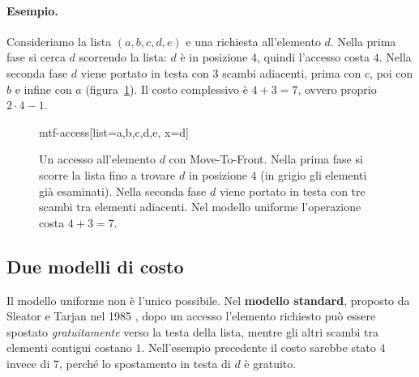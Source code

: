 \paragraph{Esempio.}
Consideriamo la lista $(a, b, c, d, e)$ e una richiesta all'elemento $d$. Nella prima fase si cerca $d$ scorrendo la lista: $d$ è in posizione $4$, quindi l'accesso costa $4$. Nella seconda fase $d$ viene portato in testa con $3$ scambi adiacenti, prima con $c$, poi con $b$ e infine con $a$ (figura~\ref{fig:mtf-accesso}). Il costo complessivo è $4 + 3 = 7$, ovvero proprio $2 \cdot 4 - 1$.

\begin{figure}[htbp]
\centering
\begin{widget}{mtf-access}[list={a,b,c,d,e}, x=d]
\end{widget}
\caption{Un accesso all'elemento $d$ con Move-To-Front. Nella prima fase si scorre la lista fino a trovare $d$ in posizione $4$ (in grigio gli elementi già esaminati). Nella seconda fase $d$ viene portato in testa con tre scambi tra elementi adiacenti. Nel modello uniforme l'operazione costa $4 + 3 = 7$.}
\label{fig:mtf-accesso}
\end{figure}

\subsection{Due modelli di costo}\label{sec:mtf-modelli}
Il modello uniforme non è l'unico possibile. Nel \textbf{modello standard}, proposto da Sleator e Tarjan nel 1985 \cite{Sleator1985-ListUpdate}, dopo un accesso l'elemento richiesto può essere spostato \emph{gratuitamente} verso la testa della lista, mentre gli altri scambi tra elementi contigui costano $1$. Nell'esempio precedente il costo sarebbe stato $4$ invece di $7$, perché lo spostamento in testa di $d$ è gratuito.

